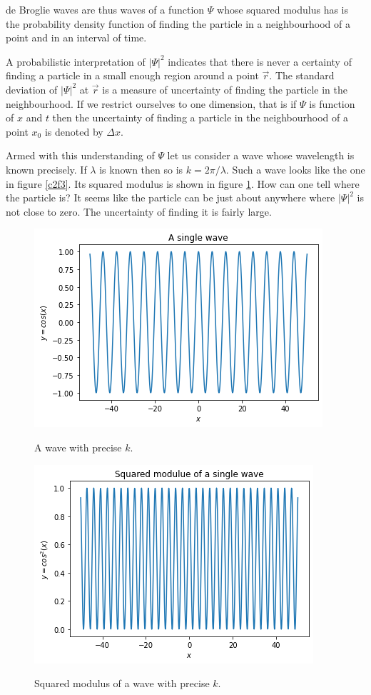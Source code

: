 de Broglie waves are thus waves of a function $\Psi$ whose squared modulus has
is the probability density function of finding the particle in a neighbourhood
of a point and in an interval of time.

A probabilistic interpretation of $|\Psi|^2$ indicates that there is never a 
certainty of finding a particle in a small enough region around a point 
$\vec{r}$. The standard deviation of $|\Psi|^2$ at $\vec{r}$ is a measure of
uncertainty of finding the particle in the neighbourhood. If we restrict 
ourselves to one dimension, that is if $\Psi$ is function of $x$ and $t$ then
the uncertainty of finding a particle in the neighbourhood of a point $x_0$ is
denoted by $\Delta x$. 

Armed with this understanding of $\Psi$ let us consider a wave whose wavelength
is known precisely. If $\lambda$ is known then so is $k = 2\pi/\lambda$. Such
a wave looks like the one in figure \ref{c2f3}. Its squared modulus is shown in
figure \ref{c2f4}. How can one tell where the particle is? It seems like the
particle can be just about anywhere where $|\Psi|^2$ is not close to zero. The
uncertainty of finding it is fairly large.
\begin{figure}
\begin{center}
\includegraphics[scale=0.5]{one-wave}
\caption{A wave with precise $k$.}\label{c2f3}
\includegraphics[scale=0.5]{one-wave-sq}
\caption{Squared modulus of a wave with precise $k$.}\label{c2f4}
\end{center}
\end{figure}
